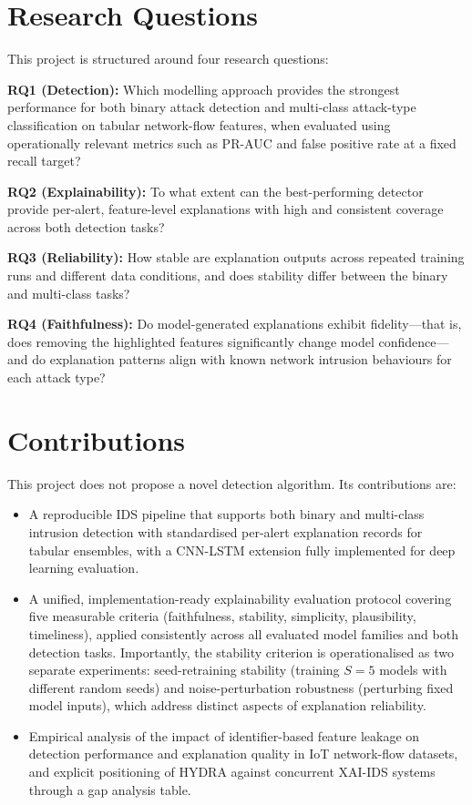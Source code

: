 \documentclass[12pt,a4paper]{report}
\begin{document}
\section{Research Questions}
\label{sec:rqs}

This project is structured around four research questions:

\noindent\textbf{RQ1 (Detection):} Which modelling approach provides the strongest performance for both binary attack detection and multi-class attack-type classification on tabular network-flow features, when evaluated using operationally relevant metrics such as PR-AUC and false positive rate at a fixed recall target?

\noindent\textbf{RQ2 (Explainability):} To what extent can the best-performing detector provide per-alert, feature-level explanations with high and consistent coverage across both detection tasks?

\noindent\textbf{RQ3 (Reliability):} How stable are explanation outputs across repeated training runs and different data conditions, and does stability differ between the binary and multi-class tasks?

\noindent\textbf{RQ4 (Faithfulness):} Do model-generated explanations exhibit fidelity---that is, does removing the highlighted features significantly change model confidence---and do explanation patterns align with known network intrusion behaviours for each attack type?

\section{Contributions}
\label{sec:contributions}

This project does not propose a novel detection algorithm. Its contributions are:
\begin{itemize}
  \item A reproducible IDS pipeline that supports both binary and multi-class intrusion detection with standardised per-alert explanation records for tabular ensembles, with a CNN-LSTM extension fully implemented for deep learning evaluation.
  \item A unified, implementation-ready explainability evaluation protocol covering five measurable criteria (faithfulness, stability, simplicity, plausibility, timeliness), applied consistently across all evaluated model families and both detection tasks. Importantly, the stability criterion is operationalised as two separate experiments: seed-retraining stability (training $S = 5$ models with different random seeds) and noise-perturbation robustness (perturbing fixed model inputs), which address distinct aspects of explanation reliability.
  \item Empirical analysis of the impact of identifier-based feature leakage on detection performance and explanation quality in IoT network-flow datasets, and explicit positioning of HYDRA against concurrent XAI-IDS systems through a gap analysis table.
\end{itemize}
\end{document}
